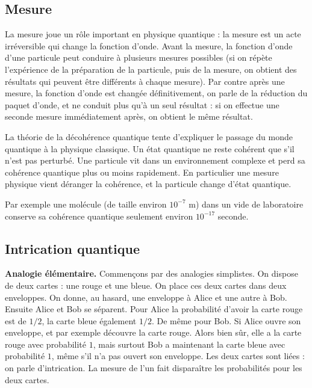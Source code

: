 \documentclass[11pt,class=report,crop=false]{standalone}
\begin{document}
\subsection{Mesure}



La mesure joue un rôle important en physique quantique : la mesure est un acte irréversible qui change la fonction d'onde.
Avant la mesure, la fonction d'onde d'une particule peut conduire à plusieurs mesures possibles (si on répète l'expérience de la préparation de la particule, puis de la mesure, on obtient des résultats qui peuvent être différents à chaque mesure).
Par contre après une mesure, la fonction d'onde est changée définitivement, on parle de la \og{}réduction du paquet d'onde\fg{}, et ne conduit plus qu'à un seul résultat : si on effectue une seconde mesure immédiatement après, on obtient le même résultat.

La théorie de la décohérence quantique tente d'expliquer le passage du monde quantique à la physique classique.
Un état quantique ne reste \og{}cohérent\fg{} que s'il n'est pas perturbé. Une particule vit dans un environnement complexe et perd sa cohérence quantique plus ou moins rapidement. En particulier une mesure physique vient déranger la cohérence, et la particule change d'état quantique.

Par exemple une molécule (de taille environ $10^{-7}$ m) dans un vide de laboratoire conserve sa cohérence quantique seulement environ $10^{-17}$ seconde.


\subsection{Intrication quantique}


\textbf{Analogie élémentaire.}
Commençons par des analogies simplistes. On dispose de deux cartes : une rouge et une bleue. On place ces deux cartes dans deux enveloppes. On donne, au hasard, une enveloppe à Alice et une autre à Bob. Ensuite Alice et Bob se séparent. Pour Alice la probabilité d'avoir la carte rouge est de $1/2$, la carte bleue également $1/2$. De même pour Bob. Si Alice ouvre son enveloppe, et par exemple découvre la carte rouge. Alors bien sûr, elle a la carte rouge avec probabilité $1$, mais surtout Bob a maintenant la carte bleue avec probabilité $1$, même s'il n'a pas ouvert son enveloppe.
Les deux cartes sont liées : on parle d'intrication. La mesure de l'un fait disparaître les probabilités pour les deux cartes.
\end{document}
